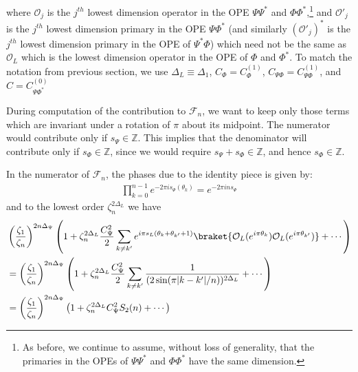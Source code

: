 \documentclass[11pt]{article}
\newcommand{\mO}{\mathcal{O}}
\newcommand{\nn}{\nonumber}
\newcommand{\lb}{\left(}
\newcommand{\rb}{\right)}
\begin{document}
  where $\mO_j$ is the $j^{th}$ lowest dimension operator in the OPE $\Psi\Psi^*$ and  $\Phi\Phi^*$,\footnote{As before, we continue to assume, without loss of generality, that the primaries in the OPEs of $\Psi \Psi^*$ and $\Phi \Phi^*$ have the same dimension.} and $\mO'_j$ is the $j^{th}$ lowest dimension primary in the OPE $\Psi\Phi^*$ (and similarly $(\mO'_j)^*$ is the $j^{th}$ lowest dimension primary in the OPE of $\Psi^*\Phi$) which need not be the same as $\mO_L$ which is the lowest dimension operator in the OPE of $\Phi$ and $\Phi^*$. To match the notation from previous section, we use $\Delta_L\equiv \Delta_1$, $C_\Phi=C_\Phi^{(1)}$, $C_{\Psi\Phi}=C^{(1)}_{\Psi\Phi}$, and $C=C_{\Psi\Phi^*}^{(0)}$

During computation of the contribution to $\mathcal{F}_n$, we want to keep only those terms which are invariant under a rotation of $\pi$ about its midpoint. The numerator would contribute only if $s_\Psi \in \mathbb{Z}$. This implies that the denominator will contribute only if $s_\Phi \in \mathbb{Z}$, since we would require $s_\Psi + s_\Phi \in \mathbb{Z}$, and hence $s_\Phi \in \mathbb{Z}$.


In the numerator of $\mathcal{F}_n$, the phases due to the identity piece is given by:
\begin{align}
  \prod_{k=0}^{n-1}e^{-2\pi i s_\Psi(\theta_k)}=e^{-2\pi i ns_\Psi}
\end{align}
and to the lowest order $\zeta_n^{2\Delta_L}$ we have 
\begin{align}
  &\lb \frac{\zeta_1}{\zeta_n}\rb^{2n\Delta_\Psi}\lb 1+\zeta_n^{2\Delta_L}\frac{C_\Psi^2}{2}\sum_{k\neq k'}e^{i\pi s_L(\theta_k+\theta_{k'}+1)}\braket{\mO_L(e^{i\pi\theta_k})\mO_L(e^{i\pi\theta_{k'}})}+\cdots \rb\nn\\
  &=\lb \frac{\zeta_1}{\zeta_n}\rb^{2n{\Delta_\Psi}}\lb 1+\zeta_n^{2\Delta_L}\frac{C^2_{\Psi}}{2}\sum_{k\neq k'}\frac{1}{(2\sin(\pi|k-k'|/n))^{2\Delta_L}}+\cdots \rb\nn\\
  &=\lb \frac{\zeta_1}{\zeta_n}\rb^{2n{\Delta_\Psi}}\lb 1+\zeta_n^{2\Delta_L}C^2_{{\Psi}} S_2(n)+\cdots \rb
\end{align}
\end{document}
